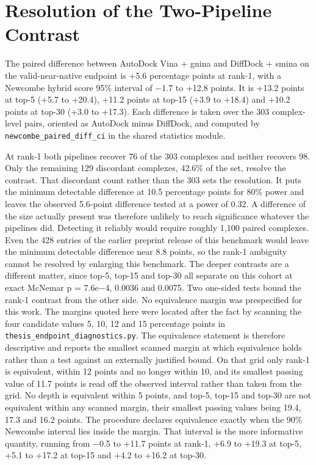 \hypertarget{resolution-of-the-two-pipeline-contrast}{%
\section{Resolution of the Two-Pipeline Contrast}\label{resolution-of-the-two-pipeline-contrast}}

The paired difference between AutoDock Vina + gnina and DiffDock + smina on the valid-near-native endpoint is +5.6 percentage points at rank-1, with a Newcombe hybrid score 95\% interval of \ensuremath{-}1.7 to +12.8 points. It is +13.2 points at top-5 (+5.7 to +20.4), +11.2 points at top-15 (+3.9 to +18.4) and +10.2 points at top-30 (+3.0 to +17.3). Each difference is taken over the 303 complex-level pairs, oriented as AutoDock minus DiffDock, and computed by \texttt{newcombe\_paired\_diff\_ci} in the shared statistics module.

At rank-1 both pipelines recover 76 of the 303 complexes and neither recovers 98. Only the remaining 129 discordant complexes, 42.6\% of the set, resolve the contrast. That discordant count rather than the 303 sets the resolution. It puts the minimum detectable difference at 10.5 percentage points for 80\% power and leaves the observed 5.6-point difference tested at a power of 0.32. A difference of the size actually present was therefore unlikely to reach significance whatever the pipelines did. Detecting it reliably would require roughly 1,100 paired complexes. Even the 428 entries of the earlier preprint release of this benchmark would leave the minimum detectable difference near 8.8 points, so the rank-1 ambiguity cannot be resolved by enlarging this benchmark. The deeper contrasts are a different matter, since top-5, top-15 and top-30 all separate on this cohort at exact McNemar p = 7.6e\ensuremath{-}4, 0.0036 and 0.0075. Two one-sided tests bound the rank-1 contrast from the other side. No equivalence margin was prespecified for this work. The margins quoted here were located after the fact by scanning the four candidate values 5, 10, 12 and 15 percentage points in \texttt{thesis\_endpoint\_diagnostics.py}. The equivalence statement is therefore descriptive and reports the smallest scanned margin at which equivalence holds rather than a test against an externally justified bound. On that grid only rank-1 is equivalent, within 12 points and no longer within 10, and its smallest passing value of 11.7 points is read off the observed interval rather than taken from the grid. No depth is equivalent within 5 points, and top-5, top-15 and top-30 are not equivalent within any scanned margin, their smallest passing values being 19.4, 17.3 and 16.2 points. The procedure declares equivalence exactly when the 90\% Newcombe interval lies inside the margin. That interval is the more informative quantity, running from \ensuremath{-}0.5 to +11.7 points at rank-1, +6.9 to +19.3 at top-5, +5.1 to +17.2 at top-15 and +4.2 to +16.2 at top-30.

